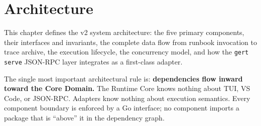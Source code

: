 \chapter{Architecture}
\label{ch:architecture}

This chapter defines the v2 system architecture: the five primary components, their interfaces and invariants,
the complete data flow from runbook invocation to trace archive, the execution lifecycle, the concurrency model,
and how the \texttt{gert serve} JSON-RPC layer integrates as a first-class adapter.

The single most important architectural rule is: \textbf{dependencies flow inward toward the Core Domain.}
The Runtime Core knows nothing about TUI, VS Code, or JSON-RPC. Adapters know nothing about execution semantics.
Every component boundary is enforced by a Go interface; no component imports a package that is ``above'' it in
the dependency graph.

